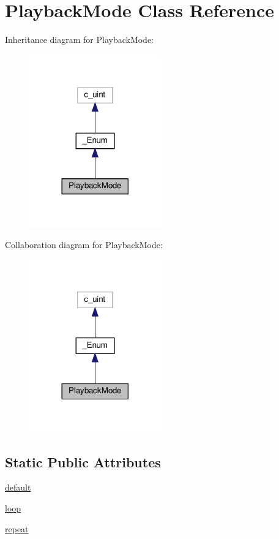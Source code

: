 \hypertarget{classvlc_1_1_playback_mode}{}\section{Playback\+Mode Class Reference}
\label{classvlc_1_1_playback_mode}


Inheritance diagram for Playback\+Mode\+:
\nopagebreak
\begin{figure}[H]
\begin{center}
\leavevmode
\includegraphics[width=161pt]{classvlc_1_1_playback_mode__inherit__graph}
\end{center}
\end{figure}


Collaboration diagram for Playback\+Mode\+:
\nopagebreak
\begin{figure}[H]
\begin{center}
\leavevmode
\includegraphics[width=161pt]{classvlc_1_1_playback_mode__coll__graph}
\end{center}
\end{figure}
\subsection*{Static Public Attributes}
\begin{DoxyCompactItemize}
\item 
\hyperlink{classvlc_1_1_playback_mode_affb1327b18bf08a379d19eef89cf1ed1}{default}
\item 
\hyperlink{classvlc_1_1_playback_mode_a56ab5fad99f595218aae18d1b7cce0d2}{loop}
\item 
\hyperlink{classvlc_1_1_playback_mode_ac00f64e7ae9c4cbe2575af8554c4401d}{repeat}
\end{DoxyCompactItemize}
